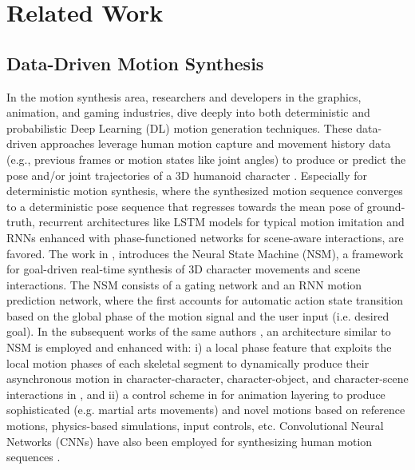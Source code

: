 \section{Related Work}
\subsection{Data-Driven Motion Synthesis}
 
In the motion synthesis area, researchers and developers in the graphics, animation, and gaming industries, dive deeply into both deterministic and probabilistic Deep Learning (DL) motion generation
techniques. These data-driven approaches leverage human motion capture and movement history data (e.g., previous frames or motion states like joint angles) to produce or predict the pose and/or joint trajectories of a 3D humanoid character \cite{Loi2023_review}. Especially for deterministic motion synthesis, where the synthesized motion sequence converges to a deterministic pose sequence that regresses towards the mean pose of ground-truth, recurrent architectures like LSTM models \cite{Aristidou2021} for typical motion imitation and RNNs enhanced with phase-functioned networks \cite{Starke2019, Starke2020, Starke2021} for scene-aware interactions, are favored. The work in \cite{Starke2019}, introduces the Neural State Machine (NSM), a framework for goal-driven real-time synthesis of 3D character movements and scene interactions. The NSM consists of a gating network and an RNN motion prediction network, where the first accounts for automatic action state transition based on the global phase of the motion signal and the user input (i.e. desired goal). In the subsequent works of the same authors \cite{Starke2020, Starke2021}, an architecture similar to NSM is employed and enhanced with: i) a local phase feature that exploits the local motion phases of each skeletal segment to dynamically produce their asynchronous motion in character-character, character-object, and character-scene interactions in \cite{Starke2020}, and ii) a control scheme in \cite{Starke2021} for animation layering to produce sophisticated (e.g. martial arts movements) and novel motions based on reference motions, physics-based simulations, input controls, etc.
Convolutional Neural Networks (CNNs) have also been employed for synthesizing human motion sequences \cite{Zhou2019}.

